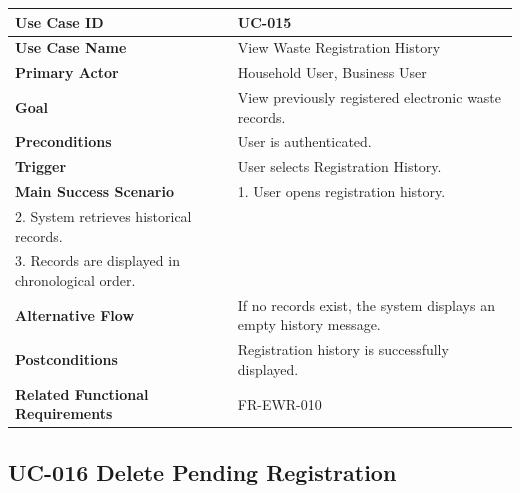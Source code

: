\begin{longtable}{|p{4cm}|p{10cm}|}

\hline
\textbf{Use Case ID} &
UC-015 \\
\hline

\textbf{Use Case Name} &
View Waste Registration History \\
\hline

\textbf{Primary Actor} &
Household User, Business User \\
\hline

\textbf{Goal} &
View previously registered electronic waste records. \\
\hline

\textbf{Preconditions} &
User is authenticated. \\
\hline

\textbf{Trigger} &
User selects Registration History. \\
\hline

\textbf{Main Success Scenario} &
1. User opens registration history.\\
2. System retrieves historical records.\\
3. Records are displayed in chronological order.\\
\hline

\textbf{Alternative Flow} &
If no records exist, the system displays an empty history message.\\
\hline

\textbf{Postconditions} &
Registration history is successfully displayed.\\
\hline

\textbf{Related Functional Requirements} &
FR-EWR-010 \\
\hline

\end{longtable}

\subsection{UC-016 Delete Pending Registration}

